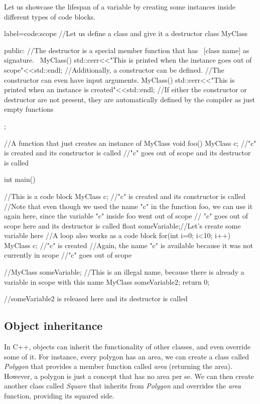 \documentclass[twoside,openright,titlepage,numbers=noenddot,%
headinclude,footinclude,cleardoublepage=empty,abstract=on,
BCOR=5mm,fontsize=11pt, dvipsnames, paper=b5
]{scrreprt}
\begin{document}
Let us showcase the lifespan of a variable by creating some instances inside different types of code blocks.
\begin{code2}{label=code:scope}
  //Let us define a class and give it a destructor
  class MyClass{

    public:
    //The destructor is a special member function that has ~[class name] as signature.
    ~MyClass(){
      std::cerr<<"This is printed when the instance goes out of scope"<<std::endl;
    }
    //Additionally, a constructor can be defined.
    //The constructor can even have input arguments.
    MyClass(){
      std::cerr<<"This is printed when an instance is created"<<std::endl;
    }
    //If either the constructor or destructor are not present, they are automatically defined by the compiler as just empty functions
  };

  //A function that just creates an instance of MyClass
  void foo(){
    MyClass c; //"c" is created and its constructor is called
  }//"c" goes out of scope and its destructor is called
  
  int main(){
    {//This is a code block
      MyClass c; //"c" is created and its constructor is called
      //Note that even though we used the name "c" in the function foo, we can use it again here, since the variable "c" inside foo went out of scope
    }// "c" goes out of scope here and its destructor is called
    float someVariable;//Let's create some variable here
    //A loop also works as a code block
    for(int i=0; i<10; i++){
      MyClass c; //"c" is created
      //Again, the name "c" is available because it was not currently in scope
    }//"c" goes out of scope

    //MyClass someVariable; //This is an illegal name, because there is already a variable in scope with this name
    MyClass someVariable2;
    return 0;
  }//someVariable2 is released here and its destructor is called
\end{code2}

\subsection*{Object inheritance}
In C++, objects can inherit the functionality of other classes, and even override some of it. For instance, every polygon has an area, we can create a class called \emph{Polygon} that provides a member function called \emph{area} (returning the area). However, a polygon is just a concept that has no area per se. We can then create another class called \emph{Square} that inherits from \emph{Polygon} and overrides the \emph{area} function, providing its squared side.
\end{document}
